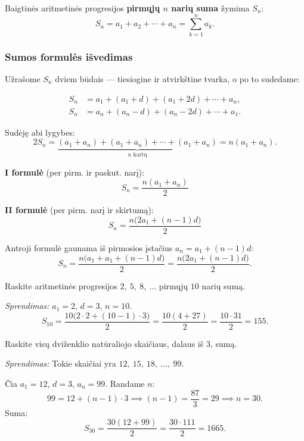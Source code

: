 \begin{definition}
Baigtinės aritmetinės progresijos \textbf{pirmųjų $n$ narių suma} žymima $S_n$:
\[
S_n = a_1 + a_2 + \cdots + a_n = \sum_{k=1}^{n} a_k.
\]
\end{definition}

\subsubsection*{Sumos formulės išvedimas}

Užrašome $S_n$ dviem būdais — tiesiogine ir atvirkštine tvarka, o po to sudedame:

\begin{align*}
S_n &= a_1 + (a_1 + d) + (a_1 + 2d) + \cdots + a_n,\\
S_n &= a_n + (a_n - d) + (a_n - 2d) + \cdots + a_1.
\end{align*}

Sudėję abi lygybes:
\[
2S_n = \underbrace{(a_1 + a_n) + (a_1 + a_n) + \cdots + (a_1 + a_n)}_{n \text{ kartų}} = n(a_1 + a_n).
\]

\begin{tcolorbox}[colback=red!5!white, colframe=red!60!black, title={Sumos formulės}]
\textbf{I formulė} (per pirm. ir paskut. narį):
\[
\boxed{S_n = \frac{n(a_1 + a_n)}{2}}
\]

\textbf{II formulė} (per pirm. narį ir skirtumą):
\[
\boxed{S_n = \frac{n\bigl(2a_1 + (n-1)d\bigr)}{2}}
\]
\end{tcolorbox}

Antroji formulė gaunama iš pirmosios įstačius $a_n = a_1 + (n-1)d$:
\[
S_n = \frac{n\bigl(a_1 + a_1 + (n-1)d\bigr)}{2} = \frac{n\bigl(2a_1 + (n-1)d\bigr)}{2}.
\]

\begin{example}
Raskite aritmetinės progresijos $2,\ 5,\ 8,\ \ldots$ pirmųjų $10$ narių sumą.

\textit{Sprendimas:} $a_1 = 2$, $d = 3$, $n = 10$.
\[
S_{10} = \frac{10\bigl(2 \cdot 2 + (10-1) \cdot 3\bigr)}{2} = \frac{10(4 + 27)}{2} = \frac{10 \cdot 31}{2} = 155.
\]
\end{example}

\begin{example}
Raskite visų dviženklio natūraliojo skaičiaus, dalaus iš $3$, sumą.

\textit{Sprendimas:} Tokie skaičiai yra $12,\ 15,\ 18,\ \ldots,\ 99$.

Čia $a_1 = 12$, $d = 3$, $a_n = 99$. Randame $n$:
\[
99 = 12 + (n-1) \cdot 3 \implies (n-1) = \frac{87}{3} = 29 \implies n = 30.
\]
Suma:
\[
S_{30} = \frac{30(12 + 99)}{2} = \frac{30 \cdot 111}{2} = 1665.
\]
\end{example}

